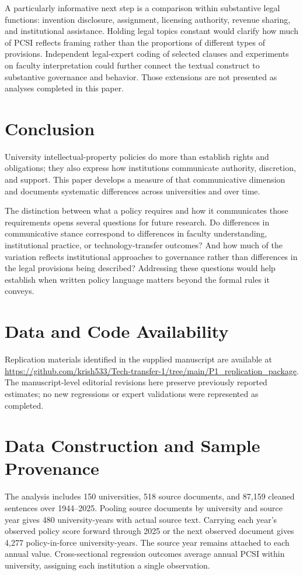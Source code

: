 \documentclass[11pt]{article}
\begin{document}
A particularly informative next step is a comparison within substantive legal functions: invention disclosure, assignment, licensing authority, revenue sharing, and institutional assistance. Holding legal topics constant would clarify how much of PCSI reflects framing rather than the proportions of different types of provisions. Independent legal-expert coding of selected clauses and experiments on faculty interpretation could further connect the textual construct to substantive governance and behavior. Those extensions are not presented as analyses completed in this paper.

\section{Conclusion}
University intellectual-property policies do more than establish rights and obligations; they also express how institutions communicate authority, discretion, and support. This paper develops a measure of that communicative dimension and documents systematic differences across universities and over time.

The distinction between what a policy requires and how it communicates those requirements opens several questions for future research. Do differences in communicative stance correspond to differences in faculty understanding, institutional practice, or technology-transfer outcomes? And how much of the variation reflects institutional approaches to governance rather than differences in the legal provisions being described? Addressing these questions would help establish when written policy language matters beyond the formal rules it conveys.

\section*{Data and Code Availability}
Replication materials identified in the supplied manuscript are available at \url{https://github.com/krish533/Tech-transfer-1/tree/main/P1_replication_package}. The manuscript-level editorial revisions here preserve previously reported estimates; no new regressions or expert validations were represented as completed.

\appendix
\section{Data Construction and Sample Provenance}
The analysis includes 150 universities, 518 source documents, and 87,159 cleaned sentences over 1944--2025. Pooling source documents by university and source year gives 480 university-years with actual source text. Carrying each year's observed policy score forward through 2025 or the next observed document gives 4,277 policy-in-force university-years. The source year remains attached to each annual value. Cross-sectional regression outcomes average annual PCSI within university, assigning each institution a single observation.
\end{document}
